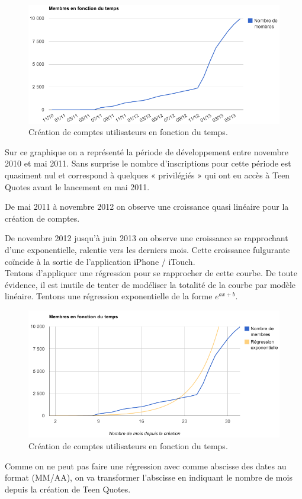 \documentclass{report}
\begin{document}
	\begin{figure}[H]
		\center
		\includegraphics[width=450px]{images/membresTemps.png}
		\caption{Création de comptes utilisateurs en fonction du temps.}
	\end{figure}
	Sur ce graphique on a représenté la période de développement entre novembre 2010 et mai 2011. Sans surprise le nombre d'inscriptions pour cette période est quasiment nul et correspond à quelques « privilégiés » qui ont eu accès à Teen Quotes avant le lancement en mai 2011.

	De mai 2011 à novembre 2012 on observe une croissance quasi linéaire pour la création de comptes.

	De novembre 2012 jusqu'à juin 2013 on observe une croissance se rapprochant d'une exponentielle, ralentie vers les derniers mois. Cette croissance fulgurante coïncide à la sortie de l'application iPhone / iTouch.\\

	Tentons d'appliquer une régression pour se rapprocher de cette courbe. De toute évidence, il est inutile de tenter de modéliser la totalité de la courbe par modèle linéaire. Tentons une régression exponentielle de la forme $e^{ax + b}$.
	\begin{figure}[H]
		\center
		\includegraphics[width=450px]{images/membresRegression.png}
		\caption{Création de comptes utilisateurs en fonction du temps.}
	\end{figure}
	Comme on ne peut pas faire une régression avec comme abscisse des dates au format (MM/AA), on va transformer l'abscisse en indiquant le nombre de mois depuis la création de Teen Quotes.\\
\end{document}
